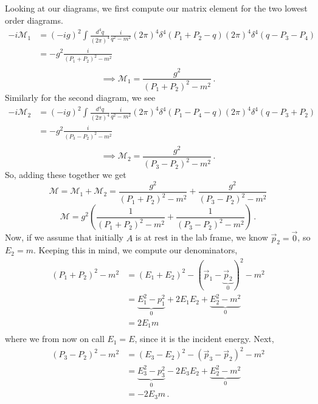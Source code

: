 \documentclass[10pt]{article}
\begin{document}
Looking at our diagrams, we first compute our matrix element for the two lowest order diagrams.
\begin{equation*}
  \begin{split}
    -i\mathcal{M}_{1} & = (-ig)^{2}\int \frac{d^{4}q}{(2\pi)^{4}} \frac{i}{q^{2} - m^{2}}(2\pi)^{4}\delta^{4}(P_{1} + P_{2} - q)(2\pi)^{4}\delta^{4}(q - P_{3} - P_{4}) \\
    & = -g^{2}\frac{i}{(P_{1} + P_{2})^{2} - m^{2}} \\
  \end{split}
\end{equation*}
\[ \implies \boxed{\mathcal{M}_{1} = \frac{g^{2}}{(P_{1} + P_{2})^{2} - m^{2}}} \, .\]
Similarly for the second diagram, we see
\begin{equation*}
  \begin{split}
    -i\mathcal{M}_{2} & = (-ig)^{2}\int \frac{d^{4}q}{(2\pi)^{4}} \frac{i}{q^{2} - m^{2}}(2\pi)^{4}\delta^{4}(P_{1} - P_{4} - q)(2\pi)^{4}\delta^{4}(q - P_{3} + P_{2}) \\
    & = -g^{2}\frac{i}{(P_{3} - P_{2})^{2} - m^{2}} \\
  \end{split}
\end{equation*}
\[ \implies \boxed{\mathcal{M}_{2} = \frac{g^{2}}{(P_{3} - P_{2})^{2} - m^{2}}}\, . \]
So, adding these together we get
\[ \mathcal{M} = \mathcal{M}_{1} + \mathcal{M}_{2} = \frac{g^{2}}{(P_{1} + P_{2})^{2} - m^{2}} + \frac{g^{2}}{(P_{3} - P_{2})^{2} - m^{2}} \]
\[ \boxed{\mathcal{M} = g^{2}\left(\frac{1}{(P_{1} + P_{2})^{2} - m^{2}} + \frac{1}{(P_{3} - P_{2})^{2} - m^{2}}\right)} \, .\]
Now, if we assume that initially $A$ is at rest in the lab frame, we know $\vec{p}_{2} = \vec{0}$, so $E_{2} = m$. Keeping this in mind, we compute our denominators,
\begin{equation*}
  \begin{split}
    (P_{1} + P_{2})^{2} - m^{2} &  = (E_{1} + E_{2})^{2} - (\vec{p}_{1} - \underbrace{\vec{p}_{2}}_{0})^{2} - m^{2} \\
    & = \underbrace{E_{1}^{2} - p_{1}^{2}}_{0} + 2E_{1}E_{2} + \underbrace{E_{2}^{2} - m^{2}}_{0} \\
    & = 2E_{1}m \\
  \end{split}
\end{equation*}
where we from now on call $E_{1} = E$, since it is the incident energy. Next,
\begin{equation*}
  \begin{split}
    (P_{3} - P_{2})^{2} - m^{2} & = (E_{3} - E_{2})^{2} - (\vec{p}_{3} - \vec{p}_{2})^{2} - m^{2} \\
    & = \underbrace{E_{3}^{2} - p_{3}^{2}}_{0} - 2E_{3}E_{2} + \underbrace{E_{2}^{2} - m^{2}}_{0} \\
    & = -2E_{3}m \, .\\
  \end{split}
\end{equation*}
\end{document}
